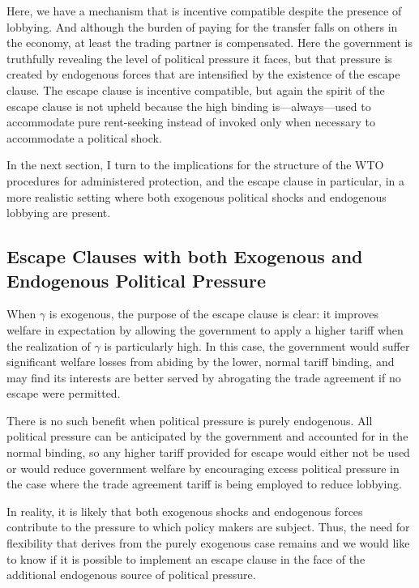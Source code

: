 \documentclass[12pt,titlepage]{article}
\newcommand{\ga}{\gamma}
\begin{document}

Here, we have a mechanism that is incentive compatible despite the presence of lobbying. And although the burden of paying for the transfer falls on others in the economy, at least the trading partner is compensated. Here the government is truthfully revealing the level of political pressure it faces, but that pressure is created by endogenous forces that are intensified by the existence of the escape clause. The escape clause is incentive compatible, but again the spirit of the escape clause is not upheld because the high binding is---always---used to accommodate pure rent-seeking instead of invoked only when necessary to accommodate a political shock.

In the next section, I turn to the implications for the structure of the WTO procedures for administered protection, and the escape clause in particular, in a more realistic setting where both exogenous political shocks and endogenous lobbying are present.


\subsection{Escape Clauses with both Exogenous and Endogenous Political Pressure}
\label{sec:escape2}
When $\ga$ is exogenous, the purpose of the escape clause is clear: it improves welfare in expectation by allowing the government to apply a higher tariff when the realization of $\ga$ is particularly high. In this case, the government would suffer significant welfare losses from abiding by the lower, normal tariff binding, and may find its interests are better served by abrogating the trade agreement if no escape were permitted.

There is no such benefit when political pressure is purely endogenous. All political pressure can be anticipated by the government and accounted for in the normal binding, so any higher tariff provided for escape would either not be used or would reduce government welfare by encouraging excess political pressure in the case where the trade agreement tariff is being employed to reduce lobbying.

In reality, it is likely that both exogenous shocks and endogenous forces contribute to the pressure to which policy makers are subject. Thus, the need for flexibility that derives from the purely exogenous case remains and we would like to know if it is possible to implement an escape clause in the face of the additional endogenous source of political pressure.
\end{document}
